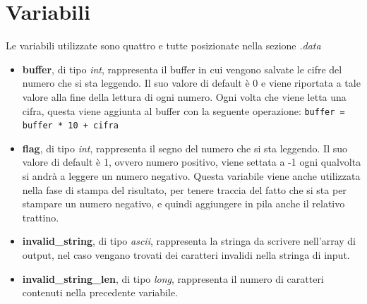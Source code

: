 \documentclass[a4paper,11pt,oneside]{book}
\begin{document}
\section{Variabili}
Le variabili utilizzate sono quattro e tutte posizionate nella sezione \emph{.data}

\begin{itemize}
  \item \textbf{buffer}, di tipo \emph{int}, rappresenta il buffer in cui vengono salvate le cifre del numero che si sta leggendo. Il suo valore di default è 0 e viene riportata a tale 
  valore alla fine della lettura di ogni numero. Ogni volta che viene letta una cifra, questa viene aggiunta al buffer con la seguente operazione: \verb|buffer = buffer * 10 + cifra|

  \item \textbf{flag}, di tipo \emph{int}, rappresenta il segno del numero che si sta leggendo. Il suo valore di default è 1, ovvero numero positivo, viene settata a -1 ogni qualvolta si andrà
  a leggere un numero negativo.
  Questa variabile viene anche utilizzata nella fase di stampa del risultato, per tenere traccia del fatto che si sta per stampare un numero negativo, e quindi aggiungere
  in pila anche il relativo trattino.

  \item \textbf{invalid\_string}, di tipo \emph{ascii}, rappresenta la stringa da scrivere nell'array di output, nel caso vengano trovati dei caratteri invalidi nella stringa di input.
  
  \item \textbf{invalid\_string\_len}, di tipo \emph{long}, rappresenta il numero di caratteri contenuti nella precedente variabile.
\end{itemize}

\newpage
\end{document}
